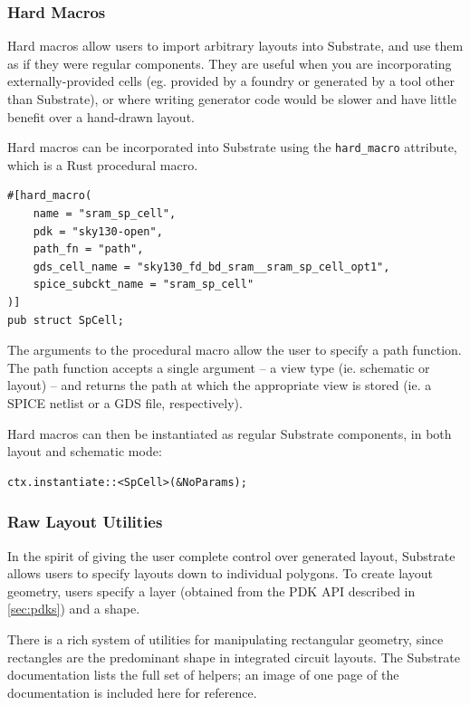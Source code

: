 \subsubsection{Hard Macros} \label{sec:hard-macros}
Hard macros allow users to import arbitrary layouts into Substrate, and use them as if they were regular components. They are useful when you are incorporating externally-provided cells (eg. provided by a foundry or generated by a tool other than Substrate), or where writing generator code would be slower and have little benefit over a hand-drawn layout.

Hard macros can be incorporated into Substrate using the \verb|hard_macro| attribute, which is a Rust procedural macro.

\begin{verbatim}
#[hard_macro(
    name = "sram_sp_cell",
    pdk = "sky130-open",
    path_fn = "path",
    gds_cell_name = "sky130_fd_bd_sram__sram_sp_cell_opt1",
    spice_subckt_name = "sram_sp_cell"
)]
pub struct SpCell;
\end{verbatim}

The arguments to the procedural macro allow the user to specify a path function. The path function accepts a single argument – a view type (ie. schematic or layout) – and returns the path at which the appropriate view is stored (ie. a SPICE netlist or a GDS file, respectively).

Hard macros can then be instantiated as regular Substrate components, in both layout and schematic mode:
\begin{verbatim}
ctx.instantiate::<SpCell>(&NoParams);
\end{verbatim}

\subsubsection{Raw Layout Utilities}

In the spirit of giving the user complete control over generated layout, Substrate allows users to
specify layouts down to individual polygons. To create layout geometry, users specify a layer
(obtained from the PDK API described in \ref{sec:pdks}) and a shape.

There is a rich system of utilities for manipulating rectangular geometry, since rectangles are the
predominant shape in integrated circuit layouts. The Substrate documentation lists the full set of
helpers; an image of one page of the documentation is included here for reference.

